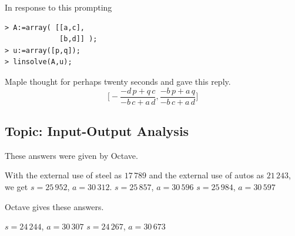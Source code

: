 \begin{ans}{4}
       In response to this prompting
\begin{indented}{\small
\begin{verbatim}
> A:=array( [[a,c],
             [b,d]] );
> u:=array([p,q]);
> linsolve(A,u);
\end{verbatim}
}\end{indented}
      Maple thought for perhaps twenty seconds and gave this reply.
      \begin{equation*}
        \bigl[-\frac{-d\,p+q\,c}{-b\,c+a\,d},
          \frac{-b\,p+a\,q}{-b\,c+a\,d}\bigr]
      \end{equation*}
    
\end{ans}
\subsection{Topic: Input-Output Analysis}
\begin{ans}{1}
      These answers were given by Octave.
      \begin{exparts}
        \partsitem With the external use of steel as $17\,789$ and the
          external use of autos as $21\,243$, we get $s=25\,952$, $a=30\,312$.
        \partsitem $s=25\,857$, $a=30\,596$
        \partsitem $s=25\,984$, $a=30\,597$
      \end{exparts}
    
\end{ans}
\begin{ans}{2}
      Octave gives these answers.
      \begin{exparts}
        \partsitem $s=24\,244$, $a=30\,307$
        \partsitem $s=24\,267$, $a=30\,673$
      \end{exparts}
    
\end{ans}
